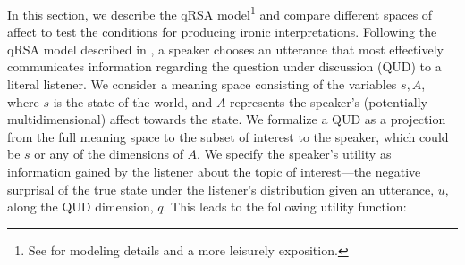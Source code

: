 \documentclass[10pt,letterpaper]{article}
\begin{document}
In this section, we describe the qRSA model\footnote{See  for modeling details and a more leisurely exposition.} and compare different spaces of affect to test the conditions for producing ironic interpretations. 
%
%
%
Following the qRSA model described in , a speaker chooses an utterance that most effectively communicates information regarding the question under discussion (QUD) to a literal listener. We consider a meaning space consisting of the variables $s, A$, where $s$ is the state of the world, and $A$ represents the speaker's (potentially multidimensional) affect towards the state. %
We formalize a QUD as a projection from the full meaning space to the subset of interest to the speaker, which could be $s$ or any of the dimensions of $A$. 
We specify the speaker's utility as information gained by the listener about the topic of interest---the negative surprisal of the true state under the listener's distribution given an utterance, $u$, along the QUD dimension, $q$. This leads to the following utility function: 
\end{document}
